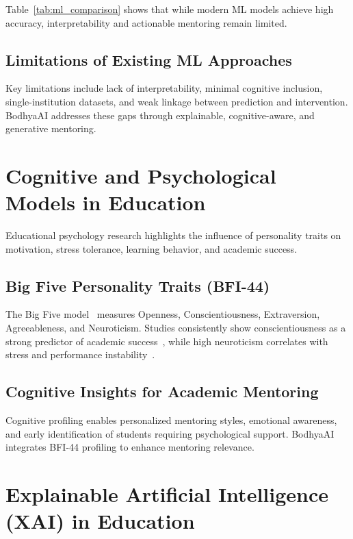 \documentclass[12pt,a4paper]{report}
\begin{document}
Table~\ref{tab:ml_comparison} shows that while modern ML models achieve high accuracy, interpretability and actionable mentoring remain limited.

\subsection{Limitations of Existing ML Approaches}

Key limitations include lack of interpretability, minimal cognitive inclusion, single-institution datasets, and weak linkage between prediction and intervention. BodhyaAI addresses these gaps through explainable, cognitive-aware, and generative mentoring.


\section{Cognitive and Psychological Models in Education}

Educational psychology research highlights the influence of personality traits on motivation, stress tolerance, learning behavior, and academic success.

\subsection{Big Five Personality Traits (BFI-44)}

The Big Five model~\cite{mccrae1992bigfive} measures Openness, Conscientiousness, Extraversion, Agreeableness, and Neuroticism. Studies consistently show conscientiousness as a strong predictor of academic success~\cite{bhattacharjee2025bigfiveacademic}, while high neuroticism correlates with stress and performance instability~\cite{liu2025bigfivecognition}.

\subsection{Cognitive Insights for Academic Mentoring}

Cognitive profiling enables personalized mentoring styles, emotional awareness, and early identification of students requiring psychological support. BodhyaAI integrates BFI-44 profiling to enhance mentoring relevance.


\section{Explainable Artificial Intelligence (XAI) in Education}
\end{document}
